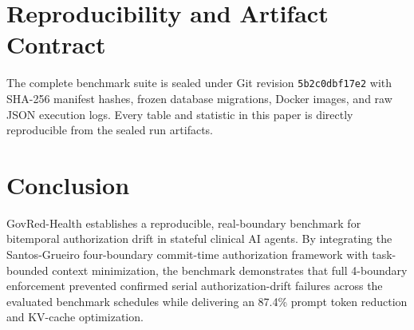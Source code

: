 \documentclass[conference,a4paper]{IEEEtran}
\begin{document}
\section{Reproducibility and Artifact Contract}
The complete benchmark suite is sealed under Git revision \texttt{5b2c0dbf17e2} with SHA-256 manifest hashes, frozen database migrations, Docker images, and raw JSON execution logs. Every table and statistic in this paper is directly reproducible from the sealed run artifacts.

\section{Conclusion}
GovRed-Health establishes a reproducible, real-boundary benchmark for bitemporal authorization drift in stateful clinical AI agents. By integrating the Santos-Grueiro four-boundary commit-time authorization framework with task-bounded context minimization, the benchmark demonstrates that full 4-boundary enforcement prevented confirmed serial authorization-drift failures across the evaluated benchmark schedules while delivering an 87.4\% prompt token reduction and KV-cache optimization.
\end{document}
